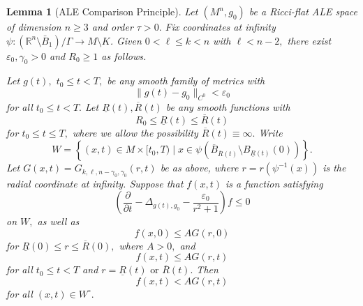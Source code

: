 \documentclass[12pt]{amsart}
\newcommand{\p}{{ \partial}}
\renewcommand{\1}{{\mathbf 1}}
\newcommand{\R}{{\mathbb R}}
\renewcommand{\p}{{\partial}}
\newcommand{\eps}{{\varepsilon}}
\newtheorem{lemma}[thm]{Lemma}
\theoremstyle{others}
\numberwithin{equation}{section}
\begin{document}
    \begin{lemma}[ALE Comparison Principle]\label{lemma:comparisonprinciple} Let $(M^n, g_0)$ be a Ricci-flat ALE space of dimension $n \geq 3$ and order $\tau > 0.$ 
    Fix coordinates at infinity $\psi : ( \R^n \setminus \bar{B}_1 ) / \Gamma \to M \setminus K  $.
    Given $0 < \ell \leq k < n$ with $\ell < n - 2,$ there exist $\eps_0, \gamma_0 > 0$ and $R_0 \geq 1$ as follows.
    
    
    Let $g(t),$ $t_0 \leq t < T,$ be any smooth %
    family of metrics with
    \begin{equation}\label{g(t)eps0closeness}
        \| g(t) - g_0 \|_{C^0} < \eps_0
    \end{equation}
    for all $t_0 \leq t < T.$ %
    Let $\underline{R}(t), \overline{R}(t)$ be any smooth functions with 
    $$R_0 \leq \underline{R}(t) \leq \overline{R}(t)$$
    for $t_0 \leq t \leq T,$ where we allow the possibility $\overline{R}(t) \equiv \infty.$
    Write
$$W = \left\{(x,t)  \in M \times [t_0, T) \mid  x \in \psi \left( \overline{B}_{\overline{R}(t) } \setminus B_{\underline{R}(t)}(0)  \right) \right\}.$$
Let $G(x,t) = G_{k,\ell, n - \gamma_0, \gamma_0}(r,t)$ be as above, where $r = r\left( \psi^{-1} (x) \right)$ is the radial coordinate at infinity.
    Suppose that $f(x,t)$ is a function satisfying
    \begin{equation}\label{comparisonprinciple:eps0evolution}
        \left( \frac{\p}{\p t} - \Delta_{g(t),g_0} - \frac{\eps_0}{r^2 + 1} \right) f \leq 0
    \end{equation}
    on $W,$ as well as
    \begin{equation}
        f(x,0) \leq A G(r,0)
    \end{equation}
    for $\underline{R}(0) \leq r \leq \overline{R}(0),$ where $A > 0,$ and
    \begin{equation}
    f(x,t) \leq A G(r, t) %
    \end{equation}
    for all $t_0 \leq t < T$ and $r = \underline{R}(t) \text{ or } \overline{R}(t).$    
    Then 
 \begin{equation}
        f(x,t) < A G(r,t) %
    \end{equation}
    for all $(x,t) \in W^\circ.$ %
    \end{lemma}
\end{document}
